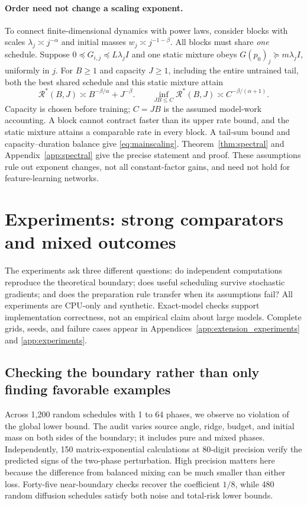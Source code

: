 \documentclass{article}
\theoremstyle{remark}\newtheorem{remark}[theorem]{Remark}
\newcommand{\R}{\mathcal R}
\begin{document}
\paragraph{Order need not change a scaling exponent.}
To connect finite-dimensional dynamics with power laws, consider blocks with scales $\lambda_j\asymp j^{-\alpha}$ and initial masses $w_j\asymp j^{-1-\beta}$. All blocks must share \emph{one} schedule. Suppose $0\preceq G_{i,j}\preceq L\lambda_j I$ and one static mixture obeys $G(p_0)_j\succeq m\lambda_j I$, uniformly in $j$. For $B\ge1$ and capacity $J\ge1$, including the entire untrained tail, both the best shared schedule and this static mixture attain
\begin{equation}
 \R^*(B,J)\asymp B^{-\beta/\alpha}+J^{-\beta}.
 \qquad \inf_{JB\le C}\R^*(B,J)\asymp C^{-\beta/(\alpha+1)}.\label{eq:mainscaling}
\end{equation}
Capacity is chosen before training; $C=JB$ is the assumed model-work accounting. A block cannot contract faster than its upper rate bound, and the static mixture attains a comparable rate in every block. A tail-sum bound and capacity--duration balance give \eqref{eq:mainscaling}. Theorem~\ref{thm:spectral} and Appendix~\ref{app:spectral} give the precise statement and proof. These assumptions rule out exponent changes, not all constant-factor gains, and need not hold for feature-learning networks.

\section{Experiments: strong comparators and mixed outcomes}\label{sec:experiments}
The experiments ask three different questions: do independent computations reproduce the theoretical boundary; does useful scheduling survive stochastic gradients; and does the preparation rule transfer when its assumptions fail? All experiments are CPU-only and synthetic. Exact-model checks support implementation correctness, not an empirical claim about large models. Complete grids, seeds, and failure cases appear in Appendices~\ref{app:extension_experiments} and \ref{app:experiments}.

\subsection{Checking the boundary rather than only finding favorable examples}
Across 1,200 random schedules with 1 to 64 phases, we observe no violation of the global lower bound. The audit varies source angle, ridge, budget, and initial mass on both sides of the boundary; it includes pure and mixed phases. Independently, 150 matrix-exponential calculations at 80-digit precision verify the predicted signs of the two-phase perturbation. High precision matters here because the difference from balanced mixing can be much smaller than either loss. Forty-five near-boundary checks recover the coefficient $1/8$, while 480 random diffusion schedules satisfy both noise and total-risk lower bounds.
\end{document}
